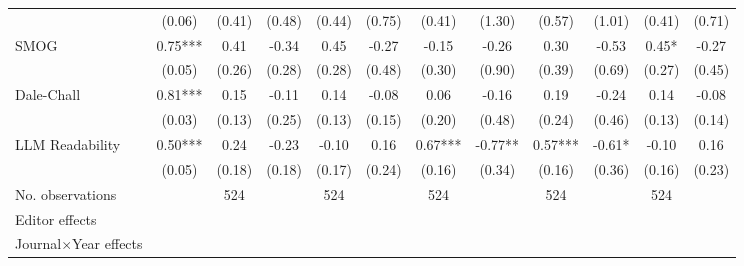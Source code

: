\begin{table}
\begin{threeparttable}
\begin{tabular}{p{3cm}S@{}S@{}S@{}S@{}S@{}S@{}S@{}S@{}S@{}S@{}S@{}}
                                          &      (0.06)   &      (0.41)   &      (0.48)   &      (0.44)   &      (0.75)   &      (0.41)   &      (1.30)   &      (0.57)   &      (1.01)   &      (0.41)   &      (0.71)   \\
            SMOG                          &        0.75***&        0.41   &       -0.34   &        0.45   &       -0.27   &       -0.15   &       -0.26   &        0.30   &       -0.53   &        0.45*  &       -0.27   \\
                                          &      (0.05)   &      (0.26)   &      (0.28)   &      (0.28)   &      (0.48)   &      (0.30)   &      (0.90)   &      (0.39)   &      (0.69)   &      (0.27)   &      (0.45)   \\
            Dale-Chall                    &        0.81***&        0.15   &       -0.11   &        0.14   &       -0.08   &        0.06   &       -0.16   &        0.19   &       -0.24   &        0.14   &       -0.08   \\
                                          &      (0.03)   &      (0.13)   &      (0.25)   &      (0.13)   &      (0.15)   &      (0.20)   &      (0.48)   &      (0.24)   &      (0.46)   &      (0.13)   &      (0.14)   \\
            LLM Readability        &        0.50***&        0.24   &       -0.23   &       -0.10   &        0.16   &        0.67***&       -0.77** &        0.57***&       -0.61*  &       -0.10   &        0.16   \\
                                          &      (0.05)   &      (0.18)   &      (0.18)   &      (0.17)   &      (0.24)   &      (0.16)   &      (0.34)   &      (0.16)   &      (0.36)   &      (0.16)   &      (0.23)   \\
            \midrule
            No. observations              &               &         524   &               &         524   &               &         524   &               &         524   &               &         524   &               \\
            \midrule
            Editor effects        &               &           {}   &               &           {}   &               &           {}   &               &           {}   &               &               &               \\
            Journal\(\times\)Year effects          &               &           {}   &               &           {}   &               &           {}   &               &           {}   &               &               &               \\

\end{tabular}
\end{threeparttable}
\end{table}
